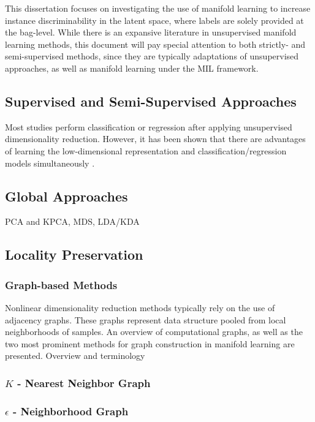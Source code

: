 This dissertation focuses on investigating the use of manifold learning to increase instance discriminability in the latent space, where labels are solely provided at the bag-level.   While there is an expansive literature in unsupervised manifold learning methods, this document will pay special attention to both strictly- and semi-supervised methods, since they are typically adaptations of unsupervised approaches, as well as manifold learning under the MIL framework.

\subsection{Supervised and Semi-Supervised Approaches}
Most studies perform classification or regression after applying unsupervised dimensionality reduction.  However, it has been shown that there are advantages of learning the low-dimensional representation and classification/regression models simultaneously \cite{Chao2019RecentAdvancesSupervisedDimRed,Rish2008SupDimRedGLM}.

\subsection{Global Approaches}
PCA and KPCA, MDS, LDA/KDA


\subsection{Locality Preservation}
\subsubsection{Graph-based Methods}
Nonlinear dimensionality reduction methods typically rely on the use of adjacency graphs.  These graphs represent data structure pooled from local neighborhoods of samples.  An overview of computational graphs, as well as the two most prominent methods for graph construction in manifold learning are presented.
Overview and terminology

\subsubsection{$K$ - Nearest Neighbor Graph}

\subsubsection{$\epsilon$ - Neighborhood Graph}

